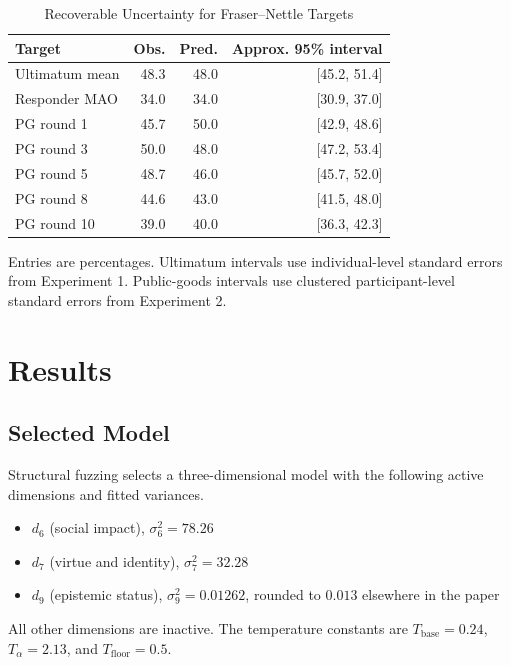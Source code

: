 \documentclass[journal]{IEEEtran}
\begin{document}
\begin{table}[!t]
\renewcommand{\arraystretch}{1.1}
\caption{Recoverable Uncertainty for Fraser--Nettle Targets}
\label{tab:ci_recoverable}
\centering
\begin{tabular}{l r r r}
\toprule
\textbf{Target} & \textbf{Obs.} & \textbf{Pred.} & \textbf{Approx. 95\% interval} \\
\midrule
Ultimatum mean & 48.3 & 48.0 & [45.2, 51.4] \\
Responder MAO & 34.0 & 34.0 & [30.9, 37.0] \\
PG round 1 & 45.7 & 50.0 & [42.9, 48.6] \\
PG round 3 & 50.0 & 48.0 & [47.2, 53.4] \\
PG round 5 & 48.7 & 46.0 & [45.7, 52.0] \\
PG round 8 & 44.6 & 43.0 & [41.5, 48.0] \\
PG round 10 & 39.0 & 40.0 & [36.3, 42.3] \\
\bottomrule
\end{tabular}
\begin{flushleft}
\footnotesize{Entries are percentages. Ultimatum intervals use individual-level standard errors from Experiment 1. Public-goods intervals use clustered participant-level standard errors from Experiment 2.}
\end{flushleft}
\end{table}
\section{Results}
\label{sec:results}

\subsection{Selected Model}

Structural fuzzing selects a three-dimensional model with the following active dimensions and fitted variances.
\begin{itemize}
    \item $d_6$ (social impact), $\sigma_6^2 = 78.26$
    \item $d_7$ (virtue and identity), $\sigma_7^2 = 32.28$
    \item $d_9$ (epistemic status), $\sigma_9^2 = 0.01262$, rounded to $0.013$ elsewhere in the paper
\end{itemize}
All other dimensions are inactive.
The temperature constants are $T_{\text{base}} = 0.24$, $T_\alpha = 2.13$, and $T_{\text{floor}} = 0.5$.
\end{document}
